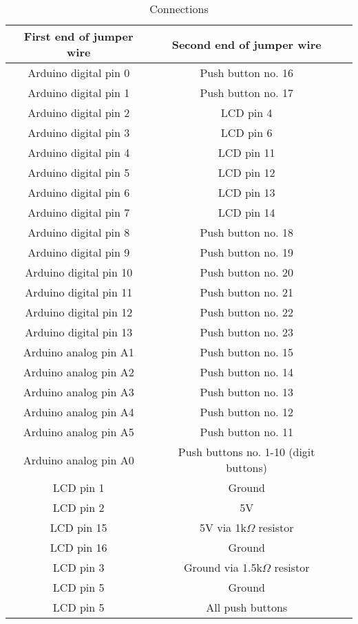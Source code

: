 \begin{table}[H]
\centering
\caption{Connections}
\label{tab:connections}
\begin{tabular}{ccc}
\toprule
First end of jumper wire & Second end of jumper wire \\
\midrule
Arduino digital pin 0 & Push button no. 16 \\
Arduino digital pin 1 & Push button no. 17 \\
Arduino digital pin 2 & LCD pin 4 \\
Arduino digital pin 3 & LCD pin 6 \\
Arduino digital pin 4 & LCD pin 11 \\
Arduino digital pin 5 & LCD pin 12 \\
Arduino digital pin 6 & LCD pin 13 \\
Arduino digital pin 7 & LCD pin 14 \\
Arduino digital pin 8 & Push button no. 18 \\
Arduino digital pin 9 & Push button no. 19 \\
Arduino digital pin 10 & Push button no. 20 \\
Arduino digital pin 11 & Push button no. 21 \\
Arduino digital pin 12 & Push button no. 22 \\
Arduino digital pin 13 & Push button no. 23 \\
Arduino analog pin A1 & Push button no. 15 \\
Arduino analog pin A2 & Push button no. 14 \\
Arduino analog pin A3 & Push button no. 13 \\
Arduino analog pin A4 & Push button no. 12 \\
Arduino analog pin A5 & Push button no. 11 \\
Arduino analog pin A0 & Push buttons no. 1-10 (digit buttons) \\
LCD pin 1 & Ground \\
LCD pin 2 & 5V \\
LCD pin 15 & 5V via 1k$\Omega$ resistor \\
LCD pin 16 & Ground \\
LCD pin 3 & Ground via 1.5k$\Omega$ resistor \\
LCD pin 5 & Ground \\
LCD pin 5 & All push buttons \\
\bottomrule
\end{tabular}
\end{table}
